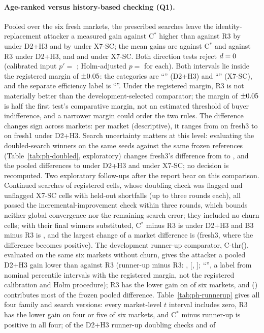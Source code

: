 \documentclass[11pt]{article}
\begin{document}
\paragraph{Age-ranked versus history-based checking (Q1).} Pooled over the six fresh markets, the prescribed searches leave the identity-replacement attacker a measured gain against C$^*$ higher than against R3 by  under D2+H3 and by  under X7-SC; the mean gains are  against C$^*$ and  against R3 under D2+H3, and  and  under X7-SC. Both direction tests reject $d = 0$ (calibrated input $p' = $ ; Holm-adjusted $p = $  for each). Both intervals lie inside the registered margin of $\pm0.05$: the categories are ``'' (D2+H3) and ``'' (X7-SC), and the separate efficiency label is ``''. Under the registered margin, R3 is not materially better than the development-selected comparator; the margin of $\pm0.05$ is half the first test's comparative margin, not an estimated threshold of buyer indifference, and a narrower margin could order the two rules. The difference changes sign across markets: per market (descriptive), it ranges from  on fresh3 to  on fresh1 under D2+H3. Search uncertainty matters at this level: evaluating the doubled-search winners on the same seeds against the same frozen references (Table~\ref{tab:ph-doubled}, exploratory) changes fresh3's difference from  to , and the pooled differences to  under D2+H3 and  under X7-SC; no decision is recomputed. Two exploratory follow-ups after the report bear on this comparison. Continued searches of  registered cells,  whose doubling check was flagged and  unflagged X7-SC cells with held-out shortfalls (up to three rounds each), all passed the incremental-improvement check within three rounds, which bounds neither global convergence nor the remaining search error; they included no churn cells; with their final winners substituted, C$^*$ minus R3 is  under D2+H3 and B3 minus R3 is , and the largest change of a market difference is  (fresh3, where the difference becomes positive). The development runner-up comparator, C-thr(), evaluated on the same six markets without churn, gives the attacker a pooled D2+H3 gain lower than against R3 (runner-up minus R3: , [, ]; ``'', a label from nominal percentile intervals with the registered margin, not the registered calibration and Holm procedure); R3 has the lower gain on  of six markets, and  () contributes most of the frozen pooled difference. Table~\ref{tab:ph-runnerup} gives all four family and search versions: every market-level $t$ interval includes zero, R3 has the lower gain on four or five of six markets, and C$^*$ minus runner-up is positive in all four;  of the  D2+H3 runner-up doubling checks and  of 
\end{document}
